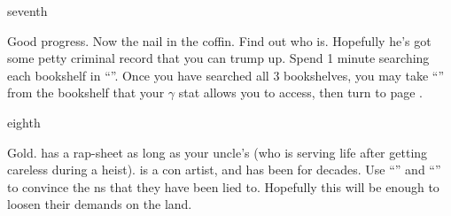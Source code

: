 \documentclass[greennotebook]{NeptuneBall}
\begin{document}
\begin{page}{seventh}

Good progress. Now the nail in the coffin. Find out who \cLiar{\MYname} is. Hopefully he's got some petty criminal record that you can trump up. Spend 1 minute searching each bookshelf in ``\sMuseum{}''. Once you have searched all 3 bookshelves, you may take ``\iRapSheet{}'' from the bookshelf that your $\gamma$ stat allows you to access, then turn to page .

\end{page}

\begin{page}{eighth}


Gold. \cLiar{\MYname} has a rap-sheet as long as your uncle's (who is serving life after getting careless during a heist). \cLiar{} is a con artist, and has been for decades. Use ``\iNorthSeasJournal{}'' and ``\iRapSheet{}'' to convince the \pPacifica{}ns that they have been lied to. Hopefully this will be enough to loosen their demands on the land.

\end{page}


\endnotebook
\end{document}
